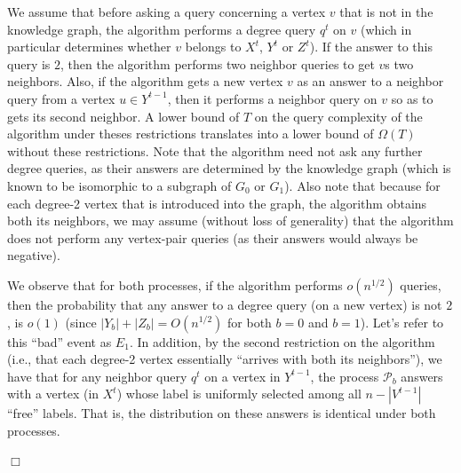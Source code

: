 \documentclass{article}
\newcommand{\calP}{{\mathcal{P}}}
\newenvironment{proof}{\smallskip\noindent{\bf Proof:}}%
        {\hspace*{\fill}$\Box$\par}
\begin{document}
\begin{proof}
We assume that before asking a query concerning a vertex $v$ that is not in the knowledge graph, the algorithm performs a degree query $q^t$ on $v$ (which in particular determines whether $v$ belongs to $X^t$, $Y^t$ or $Z^t$).
If the answer to this query is $2$, then the algorithm performs two neighbor queries to get $v$s two neighbors.
Also, if the algorithm gets a new vertex $v$ as an answer to a neighbor query from a vertex
$u \in Y^{t-1}$, then it performs a neighbor query on $v$ so as to gets its second neighbor.
A lower bound of $T$ on the query complexity of the algorithm under theses restrictions translates into a lower bound of $\Omega(T)$ without these restrictions. Note that the algorithm need not ask any further degree queries, as their answers are determined by the knowledge graph (which is known to be isomorphic to a subgraph of $G_0$ or $G_1$). Also note that because for each degree-2 vertex that is introduced into the graph, the algorithm obtains both its neighbors, we may assume (without loss of generality) that the algorithm does not perform any vertex-pair queries (as their answers would always be negative).


We observe that for both processes, if the algorithm performs $o(n^{1/2})$ queries, then the probability that any answer to a degree query (on a new vertex) is not $2$, is $o(1)$ (since $|Y_b|+|Z_b| = O(n^{1/2})$ for both $b=0$ and $b=1$). Let's refer to this ``bad'' event as $E_1$.
In addition, by the second restriction on the algorithm (i.e., that each degree-2 vertex essentially ``arrives with both its neighbors''), we have that for any neighbor query $q^t$ on a vertex in $Y^{t-1}$, the process $\calP_b$ answers with a vertex (in $X^t$) whose label is uniformly selected among all $n-|V^{t-1}|$ ``free'' labels. That is, the distribution on these answers is identical under both processes.





\end{proof}
\end{document}
